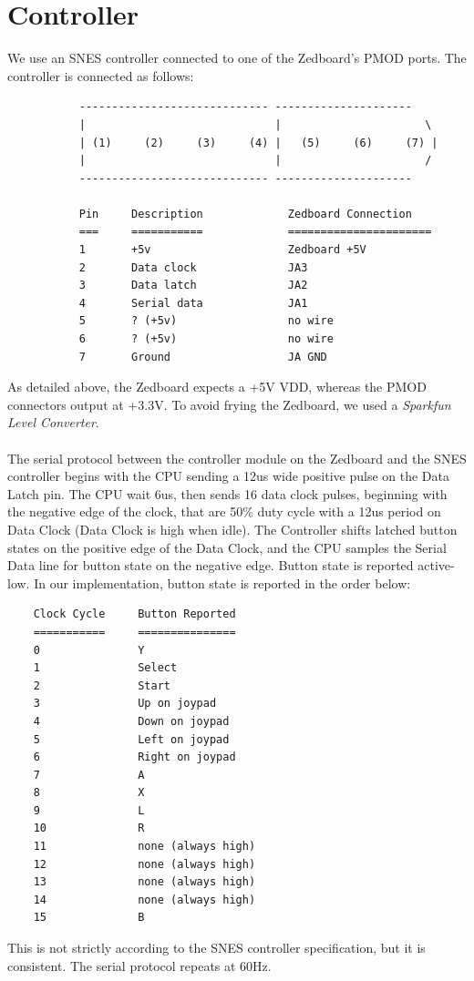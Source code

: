 \documentclass[11pt,a4paper,draft]{article}
\begin{document}
	\section{Controller}
	We use an SNES controller connected to one of the Zedboard's PMOD ports. The controller is connected as follows:
	\begin{verbatim}
	       ----------------------------- ---------------------
	       |                             |                      \
	       | (1)     (2)     (3)     (4) |   (5)     (6)     (7) |
	       |                             |                      /
	       ----------------------------- ---------------------
	       
	       Pin     Description             Zedboard Connection
	       ===     ===========             ======================
	       1       +5v                     Zedboard +5V
	       2       Data clock              JA3
	       3       Data latch              JA2
	       4       Serial data             JA1
	       5       ? (+5v)                 no wire
	       6       ? (+5v)                 no wire
	       7       Ground                  JA GND
	\end{verbatim}
	As detailed above, the Zedboard expects a +5V VDD, whereas the PMOD connectors output at +3.3V. To avoid frying the Zedboard, we used a \textit{Sparkfun Level Converter}.\\\\
	The serial protocol between the controller module on the Zedboard and the SNES controller begins with the CPU sending a 12us wide positive pulse on the Data Latch pin. The CPU wait 6us, then sends 16 data clock pulses, beginning with the negative edge of the clock, that are 50\% duty cycle with a 12us period on Data Clock (Data Clock is high when idle). The Controller shifts latched button states on the positive edge of the Data Clock, and the CPU samples the Serial Data line for button state on the negative edge. Button state is reported active-low. In our implementation, button state is reported in the order below:\\
	\begin{verbatim}
	Clock Cycle     Button Reported
	===========     ===============
	0               Y
	1               Select
	2               Start
	3               Up on joypad
	4               Down on joypad
	5               Left on joypad
	6               Right on joypad
	7               A
	8               X
	9               L
	10              R
	11              none (always high)
	12              none (always high)
	13              none (always high)
	14              none (always high)
	15              B
	\end{verbatim}
	This is not strictly according to the SNES controller specification, but it is consistent. The serial protocol repeats at 60Hz.
	
\end{document}
